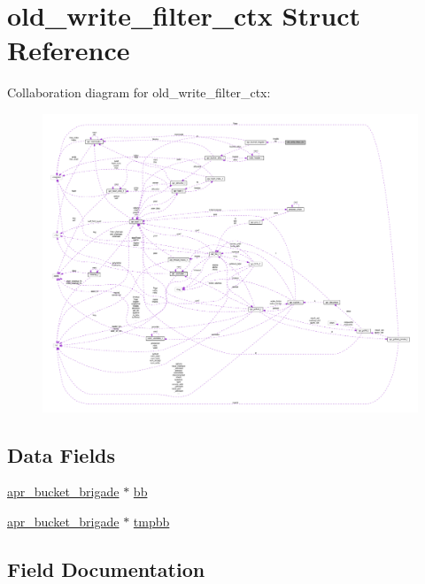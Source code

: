\hypertarget{structold__write__filter__ctx}{}\section{old\+\_\+write\+\_\+filter\+\_\+ctx Struct Reference}
\label{structold__write__filter__ctx}


Collaboration diagram for old\+\_\+write\+\_\+filter\+\_\+ctx\+:
\nopagebreak
\begin{figure}[H]
\begin{center}
\leavevmode
\includegraphics[width=350pt]{structold__write__filter__ctx__coll__graph}
\end{center}
\end{figure}
\subsection*{Data Fields}
\begin{DoxyCompactItemize}
\item 
\hyperlink{structapr__bucket__brigade}{apr\+\_\+bucket\+\_\+brigade} $\ast$ \hyperlink{structold__write__filter__ctx_a2c6961e4fddedf1bdddcb91f5318ae65}{bb}
\item 
\hyperlink{structapr__bucket__brigade}{apr\+\_\+bucket\+\_\+brigade} $\ast$ \hyperlink{structold__write__filter__ctx_abbb663a31407f6094d19697da0bd5cb5}{tmpbb}
\end{DoxyCompactItemize}


\subsection{Field Documentation}
